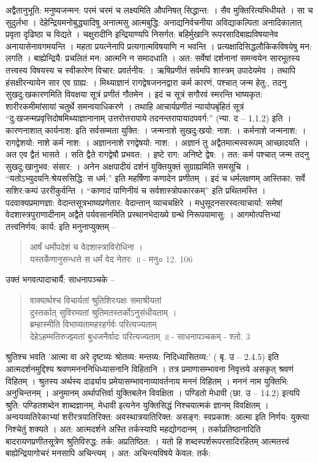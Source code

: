 अद्वैतानुभूति: मनुष्यजन्मन: परमं चरमं च लक्ष्यमिति औपनिषत् सिद्धान्त: । सैव मुक्तिरित्यभिधीयते । सा च सुदुर्लभा । देहेन्द्रियमनोबुद्ध्यादिषु अनात्मसु आत्मबुद्धि: अनाद्यनिर्वचनीया अविद्याकल्पिता अनादिकालात् प्रवृता दृढिष्ठा च विद्यते । चक्षुरादीनि इन्द्रियाण्यपि निसर्गत: बहिर्मुखानि रूपरसादिबाह्यविषयानेव अनायासेनावगमयन्ति । महता प्रयत्नेनापि प्रत्यगात्मविषयाणि न भवन्ति । प्रत्यक्षादिसिद्धलौकिकविषयेषु मन: लगति । बाह्येन्द्रियै: प्रचलितं मन: आत्मनि न समादधाति । अत: सर्वेषां दर्शनानां समन्वयेन सारभूतस्य तत्त्वस्य विषयस्य च स्वीकारेण विचार: प्रवर्तनीय: । ऋषिप्रणीतं सर्वमपि शास्त्रम् उपादेयमेव । तथापि हंसक्षीरन्यायेन सार एव ग्राह्य: । मिथ्याज्ञानं रागद्वेषजननद्वारा कर्म कारणं, पश्चात् जन्म हेतु:, तदनु सुखदु:खकारणमिति विवक्षया सूत्रं प्रणीतं गौतमेन । इदं च सूत्रं सगौरवं स्मरन्ति भाष्यकृत: शारीरकमीमांसायां चतुर्थे समन्वयाधिकरणे । तथाहि आचार्यप्रणीतं न्यायोपबृंहितं सूत्रं “दु:खजन्मप्रवृत्तिदोषमिथ्याज्ञानानाम् उत्तरोत्तरापाये तदनन्तरापायादपवर्ग:” (न्या. द – 1.1.2) इति । कारणनाशात् कार्यनाश: इति सर्वसम्मता युक्ति: । जन्मनाशे सुखदु:खयो: नाश: । कर्मनाशे जन्मनाश: । रागद्वेशयो: नाशे कर्म नाश: । अज्ञाननाशे रगद्वेषयो: नाश: । अज्ञानं तु अद्वैतमात्मस्वरूपम् आच्छादयति । अत एव द्वैतं भासते । सति द्वैते रागद्वेषौ प्रभवत: । इष्टे राग: अनिष्टे द्वेष: । तत: कर्म पश्चात् जन्म तदनु सुखदु:खानुभव: संसार: । अनेन अक्षपादीयं दर्शनं युक्तियुक्तं सुग्राह्यमिति समसूचि । “यतोऽभ्युदयनि:श्रेयससिद्धि: स धर्म:” इति महर्षिणा कणादेन प्रणीतम् । इदं च धर्मलक्षणम् आस्तिका: सर्वे सशिर:कम्पं उररीकुर्वन्ति । “काणादं पाणिनीयं च सर्वशास्त्रोपकारकम्” इति प्रथितमस्ति । पदवाक्यप्रमाणज्ञा: वेदान्तसूत्रभाष्यप्रणेतार: वेदान्तान् व्याचचक्षिरे । मधुसूदनसरस्वत्याचार्या: समेषां वेदशास्त्रपुराणादीनाम् अद्वैते पर्यवसानमिति प्रस्थानभेदाख्ये ग्रन्थे निरूपयामासु: । आगमोत्पत्तिभ्यां तत्त्वनिर्णय: कार्य: इति मनुनाप्युक्तम् –
\begin{verse}
आर्षं धर्मोपदेशं च वेदशास्त्राविरोधिना ।\\
यस्तर्केणानुसन्धत्ते स धर्मं वेद नेतरः ॥ - मनु० 12. 106
\end{verse}
उक्तं भगवत्पादाचार्यै: साधनापञ्चके –
\begin{verse}
वाक्यार्थश्च विचार्यतां श्रुतिशिरःपक्षः समाश्रीयतां\\
दुस्तर्कात् सुविरम्यतां श्रुतिमतस्तर्कोऽनुसंधीयताम् ।\\  
ब्रम्हास्मीति विभाव्यतामहरहर्गर्वः परित्यज्यताम्\\  
देहेऽहम्मतिरुज्झ्यतां बुधजनैर्वादः परित्यज्यताम् ॥ - साधनापञ्चकम् - श्लो. 3
\end{verse}
श्रुतिश्च भवति 'आत्मा वा अरे दृष्टव्यः श्रोतव्य: मन्तव्य: निदिध्यासितव्य:' ( बृ. उ – 2.4.5) इति आत्मदर्शनमुद्दिश्य श्रवणमनननिधिध्यासनानि विहितानि । तत्र प्रमाणासम्भावना निवृत्तये असकृत् श्रवणं विहितम् । श्रुतस्य अर्थस्य दार्ढ्याय प्रमेयासम्भावनाव्यावर्तनाय मननं विहितम् । मननं नाम युक्तिभि: अनुचिन्तनम् । अनुमानम् अर्थापत्तिर्वा युक्तिबलेन विवक्षिता । पण्डितो मेधावी (छा. उ – 14.2) इत्यपि श्रुति: पण्डितशब्देन शाब्दज्ञानम्, मेधावी इत्यनेन युक्तिसिद्धं निश्चयात्मकं ज्ञानम् विवक्षितम् । अन्वयव्यतिरेकाभ्यां शरीरत्रयातिरिक्त: अवस्थात्रयातिरिक्त: असङ्ग: स्वप्रकाश: आत्मा इति निर्णय: युक्त्या निश्चेतुं शक्यते । अत: आत्मदर्शने अस्ति तर्कस्यापि महद्योगदानम् । तर्काप्रतिष्ठानादिति बादरायणप्रणीतसूत्रेण श्रुतिविरुद्ध: तर्क: अप्रतिष्ठित: । यतो हि शब्दस्पर्शरूपरसादिरहितम् आत्मतत्त्वं बाह्येन्द्रियागोचरं मनसापि अचिन्त्यम् । अत: अचिन्त्यविषये केवल: तर्क:
